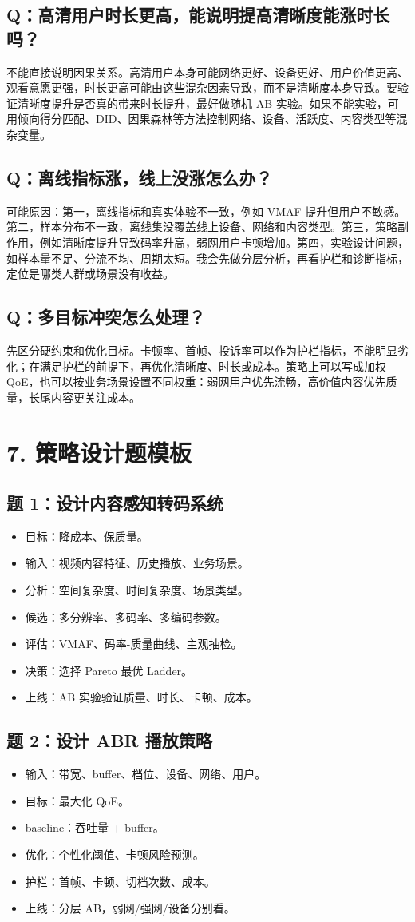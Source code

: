 ﻿\documentclass[11pt,a4paper]{ctexart}
\newcommand{\qa}[2]{\subsection*{Q：#1}\begin{answerbox}#2\end{answerbox}}
\begin{document}
\qa{高清用户时长更高，能说明提高清晰度能涨时长吗？}{不能直接说明因果关系。高清用户本身可能网络更好、设备更好、用户价值更高、观看意愿更强，时长更高可能由这些混杂因素导致，而不是清晰度本身导致。要验证清晰度提升是否真的带来时长提升，最好做随机 AB 实验。如果不能实验，可用倾向得分匹配、DID、因果森林等方法控制网络、设备、活跃度、内容类型等混杂变量。}

\qa{离线指标涨，线上没涨怎么办？}{可能原因：第一，离线指标和真实体验不一致，例如 VMAF 提升但用户不敏感。第二，样本分布不一致，离线集没覆盖线上设备、网络和内容类型。第三，策略副作用，例如清晰度提升导致码率升高，弱网用户卡顿增加。第四，实验设计问题，如样本量不足、分流不均、周期太短。我会先做分层分析，再看护栏和诊断指标，定位是哪类人群或场景没有收益。}

\qa{多目标冲突怎么处理？}{先区分硬约束和优化目标。卡顿率、首帧、投诉率可以作为护栏指标，不能明显劣化；在满足护栏的前提下，再优化清晰度、时长或成本。策略上可以写成加权 QoE，也可以按业务场景设置不同权重：弱网用户优先流畅，高价值内容优先质量，长尾内容更关注成本。}

\section{7. 策略设计题模板}
\subsection*{题 1：设计内容感知转码系统}
\begin{itemize}
  \item 目标：降成本、保质量。
  \item 输入：视频内容特征、历史播放、业务场景。
  \item 分析：空间复杂度、时间复杂度、场景类型。
  \item 候选：多分辨率、多码率、多编码参数。
  \item 评估：VMAF、码率-质量曲线、主观抽检。
  \item 决策：选择 Pareto 最优 Ladder。
  \item 上线：AB 实验验证质量、时长、卡顿、成本。
\end{itemize}

\subsection*{题 2：设计 ABR 播放策略}
\begin{itemize}
  \item 输入：带宽、buffer、档位、设备、网络、用户。
  \item 目标：最大化 QoE。
  \item baseline：吞吐量 + buffer。
  \item 优化：个性化阈值、卡顿风险预测。
  \item 护栏：首帧、卡顿、切档次数、成本。
  \item 上线：分层 AB，弱网/强网/设备分别看。
\end{itemize}
\end{document}
